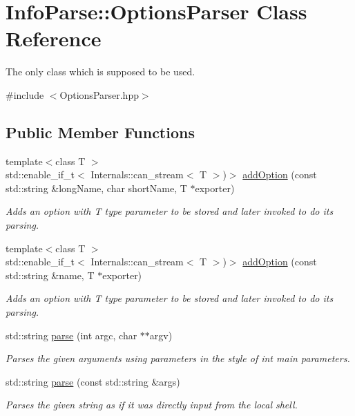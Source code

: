 \hypertarget{class_info_parse_1_1_options_parser}{}\section{Info\+Parse\+::Options\+Parser Class Reference}
\label{class_info_parse_1_1_options_parser}


The only class which is supposed to be used.




{\ttfamily \#include $<$Options\+Parser.\+hpp$>$}

\subsection*{Public Member Functions}
\begin{DoxyCompactItemize}
    \item
    {\footnotesize template$<$class T $>$ }\\std\+::enable\+\_\+if\+\_\+t$<$ Internals\+::can\+\_\+stream$<$ T $>$)$>$ \mbox{\hyperlink{class_info_parse_1_1_options_parser_a1f2d084e8086dfbfac406d24045dadff}{add\+Option}} (const std\+::string \&long\+Name, char short\+Name, T $\ast$exporter)
    \begin{DoxyCompactList}
        \small\item\em Adds an option with T type parameter to be stored and later invoked to do its parsing.
    \end{DoxyCompactList}\item
    {\footnotesize template$<$class T $>$ }\\std\+::enable\+\_\+if\+\_\+t$<$ Internals\+::can\+\_\+stream$<$ T $>$)$>$ \mbox{\hyperlink{class_info_parse_1_1_options_parser_a034a9658fa2ef9480de36055349e4408}{add\+Option}} (const std\+::string \&name, T $\ast$exporter)
    \begin{DoxyCompactList}
        \small\item\em Adds an option with T type parameter to be stored and later invoked to do its parsing.
    \end{DoxyCompactList}\item
    std\+::string \mbox{\hyperlink{class_info_parse_1_1_options_parser_a9b6c22651efe911c4710ef0f27b71d44}{parse}} (int argc, char $\ast$$\ast$argv)
    \begin{DoxyCompactList}
        \small\item\em Parses the given arguments using parameters in the style of {\ttfamily int main} parameters.
    \end{DoxyCompactList}\item
    std\+::string \mbox{\hyperlink{class_info_parse_1_1_options_parser_a78fa47e8a288b70ebbe3a9597c846a49}{parse}} (const std\+::string \&args)
    \begin{DoxyCompactList}
        \small\item\em Parses the given string as if it was directly input from the local shell.
    \end{DoxyCompactList}
\end{DoxyCompactItemize}


